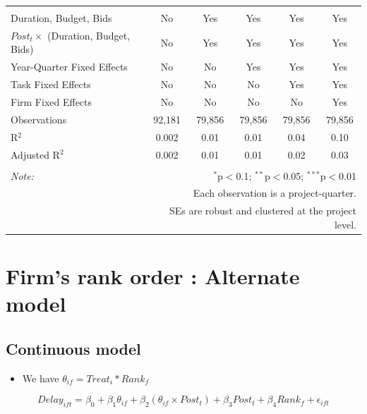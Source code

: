\documentclass[]{article}
\providecommand{\tightlist}{%
  \setlength{\itemsep}{0pt}\setlength{\parskip}{0pt}}
\begin{document}
\begin{table}[H]
\begin{tabular}{@{\extracolsep{-2pt}}lccccc}
  & & & & & \\ 
\hline \\[-1.8ex] 
Duration, Budget, Bids & No & Yes & Yes & Yes & Yes \\ 
$Post_t \times$  (Duration, Budget, Bids) & No & Yes & Yes & Yes & Yes \\ 
Year-Quarter Fixed Effects & No & No & Yes & Yes & Yes \\ 
Task Fixed Effects & No & No & No & Yes & Yes \\ 
Firm Fixed Effects & No & No & No & No & Yes \\ 
Observations & 92,181 & 79,856 & 79,856 & 79,856 & 79,856 \\ 
R$^{2}$ & 0.002 & 0.01 & 0.01 & 0.04 & 0.10 \\ 
Adjusted R$^{2}$ & 0.002 & 0.01 & 0.01 & 0.02 & 0.03 \\ 
\hline 
\hline \\[-1.8ex] 
\textit{Note:}  & \multicolumn{5}{r}{$^{*}$p$<$0.1; $^{**}$p$<$0.05; $^{***}$p$<$0.01} \\ 
 & \multicolumn{5}{r}{Each observation is a project-quarter.} \\ 
 & \multicolumn{5}{r}{SEs are robust and clustered at the project level.} \\ 
\end{tabular} 
\end{table}

\hypertarget{firms-rank-order-alternate-model}{%
\section{Firm's rank order : Alternate
model}\label{firms-rank-order-alternate-model}}

\hypertarget{continuous-model}{%
\subsection{Continuous model}\label{continuous-model}}

\begin{itemize}
\tightlist
\item
  We have \(\theta_{if} = Treat_i * Rank_f\)
\end{itemize}

\[ Delay_{ift} = \beta_0 + \beta_1 \theta_{if} + \beta_2 (\theta_{if} \times Post_t) + \beta_3 Post_t + \beta_4 Rank_f + \epsilon_{ift} \]
\end{document}
